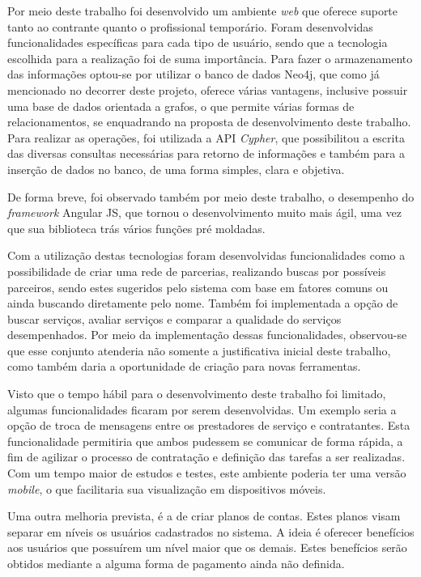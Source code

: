 \par  Por meio deste trabalho foi desenvolvido um ambiente \textit{web} que oferece suporte tanto ao contrante quanto o profissional temporário. Foram desenvolvidas funcionalidades específicas para cada tipo de usuário, sendo que a tecnologia escolhida para a realização foi de suma importância. Para fazer o armazenamento das informações optou-se por utilizar o banco de dados Neo4j, que como já mencionado no decorrer deste projeto, oferece várias vantagens, inclusive possuir uma base de dados orientada a grafos, o que permite várias formas de relacionamentos, se enquadrando na proposta de desenvolvimento deste trabalho. Para realizar as operações, foi utilizada a API \textit{Cypher}, que possibilitou a escrita das diversas consultas necessárias para retorno de informações e também para a inserção de dados no banco, de uma forma simples, clara e objetiva. 

\par De forma breve, foi observado também por meio deste trabalho, o desempenho do \textit{framework} Angular JS, que tornou o desenvolvimento muito mais ágil, uma vez que sua biblioteca trás vários funções pré moldadas.

\par Com a utilização destas tecnologias foram desenvolvidas funcionalidades como a possibilidade de criar uma rede de parcerias, realizando buscas por possíveis parceiros, sendo estes sugeridos pelo sistema com base em fatores comuns ou ainda buscando diretamente pelo nome. Também foi implementada a opção de buscar serviços, avaliar serviços e comparar a qualidade do serviços desempenhados. Por meio da implementação dessas funcionalidades, observou-se que esse conjunto  atenderia não somente a justificativa inicial deste trabalho, como também daria a oportunidade de criação para novas ferramentas.

\par Visto que o tempo hábil para o desenvolvimento deste trabalho foi limitado, algumas funcionalidades ficaram por serem desenvolvidas. Um exemplo seria a opção de troca de mensagens entre os prestadores de serviço e contratantes. Esta funcionalidade permitiria que ambos pudessem se comunicar de forma rápida, a fim de agilizar o processo de contratação e definição das tarefas a ser realizadas. Com um tempo maior de estudos e testes, este ambiente poderia ter uma versão \textit{mobile}, o que facilitaria sua visualização em dispositivos móveis. 

\par Uma outra melhoria prevista, é a de criar planos de contas. Estes planos visam separar em níveis os usuários cadastrados no sistema. A ideia é oferecer benefícios aos usuários que possuírem um nível maior que os demais. Estes benefícios serão obtidos mediante a alguma forma de pagamento ainda não definida.

